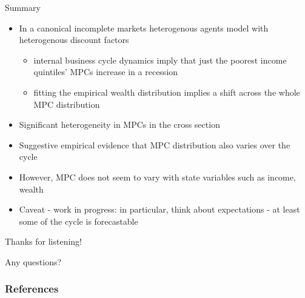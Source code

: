 \documentclass{beamer}
\begin{document}
 \begin{frame}{Summary}
	\begin{itemize}
	\item In a canonical incomplete markets heterogenous agents model with heterogenous discount factors
	\begin{itemize}
	 \item internal business cycle dynamics imply that just the poorest income quintiles' MPCs increase in a recession
	 \item fitting the empirical wealth distribution implies a shift across the whole MPC distribution
 	\end{itemize}
 \item Significant heterogeneity in MPCs in the cross section
 \item Suggestive empirical evidence that MPC distribution also varies over the cycle
 \item However, MPC does not seem to vary with state variables such as income, wealth
 \item Caveat - work in progress: in particular, think about expectations - at least some of the cycle is forecastable



	\end{itemize}
	
	
\end{frame}
 \begin{frame}{Thanks for listening!}

Any questions?
		
	\end{frame}
	
\begin{frame}[allowframebreaks]
	\frametitle{References}
	
	
\end{frame}
\end{document}
